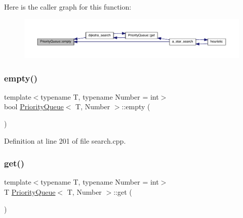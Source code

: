 Here is the caller graph for this function\+:\nopagebreak
\begin{figure}[H]
\begin{center}
\leavevmode
\includegraphics[width=350pt]{struct_priority_queue_a422e38d0c3b8398dc6e4867bb4ceec41_icgraph}
\end{center}
\end{figure}
\mbox{\label{struct_priority_queue_a422e38d0c3b8398dc6e4867bb4ceec41}} 
\subsubsection{\texorpdfstring{empty()}{empty()}\hspace{0.1cm}{\footnotesize\ttfamily [2/2]}}
{\footnotesize\ttfamily template$<$typename T, typename Number = int$>$ \\
bool \hyperlink{struct_priority_queue}{Priority\+Queue}$<$ T, Number $>$\+::empty (\begin{DoxyParamCaption}{ }\end{DoxyParamCaption})\hspace{0.3cm}{\ttfamily [inline]}}



Definition at line 201 of file search.\+cpp.

\mbox{\label{struct_priority_queue_ab211c9583fda5c1a6352021444af5f0e}} 
\subsubsection{\texorpdfstring{get()}{get()}\hspace{0.1cm}{\footnotesize\ttfamily [1/2]}}
{\footnotesize\ttfamily template$<$typename T, typename Number = int$>$ \\
T \hyperlink{struct_priority_queue}{Priority\+Queue}$<$ T, Number $>$\+::get (\begin{DoxyParamCaption}{ }\end{DoxyParamCaption})\hspace{0.3cm}{\ttfamily [inline]}}



